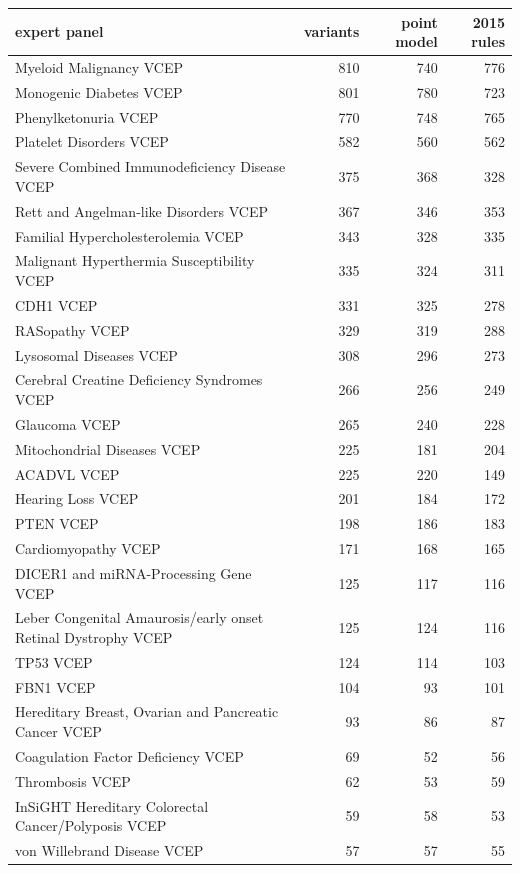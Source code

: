 \begin{table}[p]\centering\footnotesize\begin{tabular}{lrrr}\hline expert panel & variants & point model & 2015 rules\\\hline
Myeloid Malignancy VCEP & 810 & 740 & 776\\
Monogenic Diabetes VCEP & 801 & 780 & 723\\
Phenylketonuria VCEP & 770 & 748 & 765\\
Platelet Disorders VCEP & 582 & 560 & 562\\
Severe Combined Immunodeficiency Disease  VCEP & 375 & 368 & 328\\
Rett and Angelman-like Disorders VCEP & 367 & 346 & 353\\
Familial Hypercholesterolemia VCEP & 343 & 328 & 335\\
Malignant Hyperthermia Susceptibility VCEP & 335 & 324 & 311\\
CDH1 VCEP & 331 & 325 & 278\\
RASopathy VCEP & 329 & 319 & 288\\
Lysosomal Diseases VCEP & 308 & 296 & 273\\
Cerebral Creatine Deficiency Syndromes VCEP & 266 & 256 & 249\\
Glaucoma VCEP & 265 & 240 & 228\\
Mitochondrial Diseases VCEP & 225 & 181 & 204\\
ACADVL VCEP & 225 & 220 & 149\\
Hearing Loss VCEP & 201 & 184 & 172\\
PTEN VCEP & 198 & 186 & 183\\
Cardiomyopathy VCEP & 171 & 168 & 165\\
DICER1 and miRNA-Processing Gene VCEP & 125 & 117 & 116\\
Leber Congenital Amaurosis/early onset Retinal Dystrophy VCEP & 125 & 124 & 116\\
TP53 VCEP & 124 & 114 & 103\\
FBN1 VCEP & 104 & 93 & 101\\
Hereditary Breast, Ovarian and Pancreatic Cancer VCEP & 93 & 86 & 87\\
Coagulation Factor Deficiency VCEP & 69 & 52 & 56\\
Thrombosis VCEP & 62 & 53 & 59\\
InSiGHT Hereditary Colorectal Cancer/Polyposis VCEP & 59 & 58 & 53\\
von Willebrand Disease  VCEP & 57 & 57 & 55\\

\end{tabular}
\end{table}
